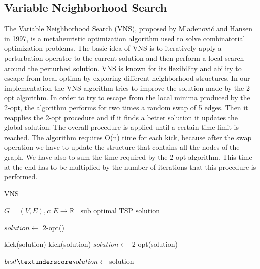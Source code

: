 \subsection{Variable Neighborhood Search}
The Variable Neighborhood Search (VNS), proposed by Mladenović and Hansen in 1997,  is a metaheuristic optimization algorithm used to solve combinatorial optimization problems. The basic idea of VNS is to iteratively apply a perturbation operator to the current solution and then perform a local search around the perturbed solution. VNS is known for its flexibility and ability to escape from local optima by exploring different neighborhood structures.
In our implementation the VNS algorithm tries to improve the solution made by the 2-opt algorithm. In order to try to escape from the local minima produced by the 2-opt, the algorithm performs for two times a random swap of 5 edges. 
Then it reapplies the 2-opt procedure and if it finds a better solution it updates the global solution.
The overall procedure is applied until a certain time limit is reached.
The algorithm requires O(n) time for each kick, because after the swap operation we have to update the structure that contains all the nodes of the graph. We have also to sum the time required by the 2-opt algorithm. This time at the end has to be multiplied by the number of iterations that this procedure is performed. 

\begin{algorithm}[h!]
    \caption{VNS}\label{algo:VNS}
    \begin{algorithmic}[1]
    \Require $G = (V,E), c:E \to \mathbb{R}^+$
    \Ensure $\text{sub optimal TSP solution}$


    \State $solution \gets$ 2-opt()
   
   
    \State kick(solution) 
    \State kick(solution)  
    \State $ solution \gets $ 2-opt(solution)
    
    
    \State $ best\textunderscore solution \gets$ solution
    \EndIf
    

    \EndWhile

    \end{algorithmic}
\end{algorithm}



